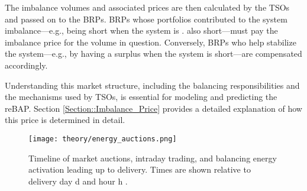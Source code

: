 \documentclass[class=scrbook, crop=false]{standalone}
\begin{document}
The imbalance volumes and associated prices are then calculated by the \gls{TSO}s and passed on to the  \gls{BRP}s.  \gls{BRP}s whose portfolios contributed to the system imbalance—e.g., being short when the system is . also short—must pay the imbalance price for the volume in question. Conversely, \gls{BRP}s who help stabilize the system—e.g., by having a surplus when the system is short—are compensated accordingly. 

Understanding this market structure, including the balancing responsibilities and the mechanisms used by  \gls{TSO}s, is essential for modeling and predicting the  \gls{reBAP}. Section \ref{Section::Imbalance_Price} provides a detailed explanation of how this price is determined in detail. 





\begin{figure}[ht]
            \centering
            \texttt{[image: theory/energy\_auctions.png]}
            \caption[Timeschedule for energy market auctions]{Timeline of market auctions, intraday trading, and balancing energy activation leading up to delivery. Times are shown relative to delivery day 
d and hour 
h \cite{narajewskiProbabilisticForecastingGerman2022}.}
            \label{fig::energy_auctions}
 \end{figure}
\end{document}
